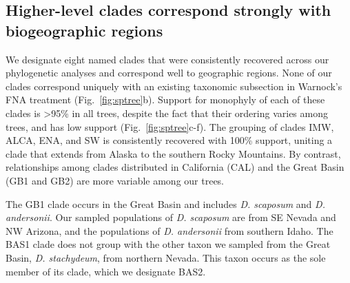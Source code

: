 \documentclass[11pt]{article}
\begin{document}
\subsection{Higher-level clades correspond strongly with biogeographic regions}
We designate eight named clades that were consistently recovered across our
phylogenetic analyses and correspond well to geographic regions. None of our
clades correspond uniquely with an existing taxonomic subsection in Warnock's
FNA treatment (Fig.~\ref{fig:sptree}b). 
% 
Support for monophyly of each of these clades is >95\% in all trees, despite 
the fact that their ordering varies among trees, and has low support 
(Fig.~\ref{fig:sptree}c-f).
% 
The grouping of clades IMW, ALCA, ENA, and SW is consistently recovered with 
100\% support, uniting a clade that extends from Alaska to the southern Rocky
Mountains. By contrast, relationships among clades distributed in California 
(CAL) and the Great Basin (GB1 and GB2) are more variable among our trees.
% 
% 
% 
% 

The GB1 clade occurs in the Great Basin and includes \emph{D. scaposum} and
\emph{D. andersonii}. 
Our sampled populations of \emph{D. scaposum} are from SE Nevada and NW Arizona, 
and the populations of \emph{D. andersonii} from southern Idaho. 
% 
The BAS1 clade does not group with the other taxon we sampled from the Great
Basin, \emph{D. stachydeum}, from northern Nevada. This taxon occurs as the 
sole member of its clade, which we designate BAS2.
\end{document}

